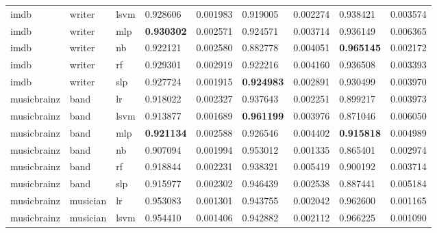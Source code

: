 \documentclass[epsfig,a4paper,11pt,titlepage,twoside,openany]{book}
\begin{document}
\begin{longtable}{|l|l|l|l|l|l|l|l|l|}
imdb        & writer   & lsvm  & 0.928606                           & 0.001983 & 0.919005                           & 0.002274 & 0.938421                           & 0.003574 \\
imdb        & writer   & mlp   & \textbf{0.930302} & 0.002571 & 0.924571                           & 0.003714 & 0.936149                           & 0.006365 \\
imdb        & writer   & nb    & 0.922121                           & 0.002580 & 0.882778                           & 0.004051 & \textbf{0.965145} & 0.002172 \\
imdb        & writer   & rf    & 0.929301                           & 0.002919 & 0.922216                           & 0.004160 & 0.936508                           & 0.003393 \\
imdb        & writer   & slp   & 0.927724                           & 0.001915 & \textbf{0.924983} & 0.002891 & 0.930499                           & 0.003970 \\ \hline
musicbrainz & band     & lr    & 0.918022                           & 0.002327 & 0.937643                           & 0.002251 & 0.899217                           & 0.003973 \\
musicbrainz & band     & lsvm  & 0.913877                           & 0.001689 & \textbf{0.961199} & 0.003976 & 0.871046                           & 0.006050 \\
musicbrainz & band     & mlp   & \textbf{0.921134} & 0.002588 & 0.926546                           & 0.004402 & \textbf{0.915818} & 0.004989 \\
musicbrainz & band     & nb    & 0.907094                           & 0.001994 & 0.953012                           & 0.001335 & 0.865401                           & 0.002974 \\
musicbrainz & band     & rf    & 0.918844                           & 0.002231 & 0.938321                           & 0.005419 & 0.900192                           & 0.003714 \\
musicbrainz & band     & slp   & 0.915977                           & 0.002302 & 0.946439                           & 0.002538 & 0.887441                           & 0.005184 \\ \hline
musicbrainz & musician & lr    & 0.953083                           & 0.001301 & 0.943755                           & 0.002042 & 0.962600                           & 0.001165 \\
musicbrainz & musician & lsvm  & 0.954410                           & 0.001406 & 0.942882                           & 0.002112 & 0.966225                           & 0.001090 \\

\end{longtable}
\end{document}

